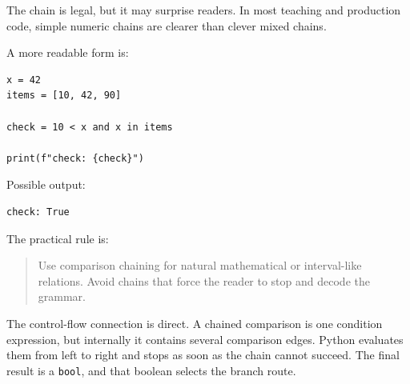 The chain is legal, but it may surprise readers. In most teaching and production code, simple numeric chains are clearer than clever mixed chains.

A more readable form is:

\begin{verbatim}
x = 42
items = [10, 42, 90]

check = 10 < x and x in items

print(f"check: {check}")
\end{verbatim}

Possible output:

\begin{verbatim}
check: True
\end{verbatim}

The practical rule is:

\begin{quote}
Use comparison chaining for natural mathematical or interval-like relations. Avoid chains that force the reader to stop and decode the grammar.
\end{quote}

The control-flow connection is direct. A chained comparison is one condition expression, but internally it contains several comparison edges. Python evaluates them from left to right and stops as soon as the chain cannot succeed. The final result is a \texttt{bool}, and that boolean selects the branch route.